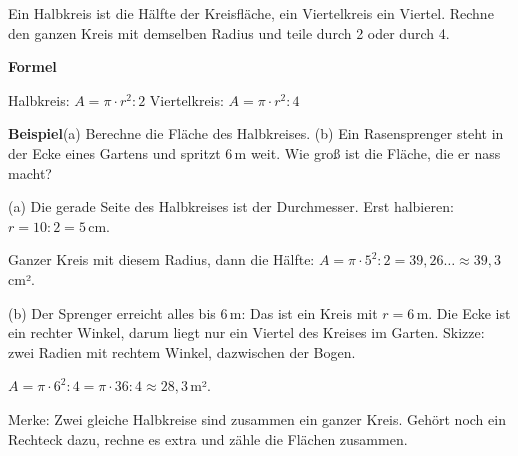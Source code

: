 \documentclass[11pt]{article}
\makeatletter
\newlength{\kr}
\newcommand{\karomerk}[2]{\protected@write\@auxout{}{\string\karoseite{#1}{#2}{\thepage}}}
\newcommand{\karoseite}[3]{\expandafter\xdef\csname karo@#1@#2\endcsname{#3}}
\makeatother
\begin{document}
\par\vspace{3mm}\setlength{\kr}{\dimexpr\pagegoal-\pagetotal-10mm\relax}%
\ifdim\kr>12mm\karomerk{k}{A}\noindent{\scriptsize\color{mbgrau}Platz zum Rechnen}\par\nointerlineskip\vspace{1mm}\noindent
\begin{tikzpicture}\clip (0,0) rectangle ({\linewidth-0.5mm},\kr);\draw[black!16,line width=0.3pt,step=5mm] (0,0) grid (\linewidth,\kr);\end{tikzpicture}\fi\par
\clearpage\label{s:B}\noindent\colorbox{black!12}{}\hspace{3mm}{\Large\bfseries Halbkreis und Viertelkreis}\par\smallskip
\noindent Ein Halbkreis ist die Hälfte der Kreisfläche, ein Viertelkreis ein Viertel. Rechne den ganzen Kreis mit demselben Radius und teile durch 2 oder durch 4.\par\medskip
\noindent\textbf{Formel}\par\nopagebreak\noindent\hspace*{4mm}\begin{minipage}{\dimexpr\linewidth-4mm\relax}Halbkreis: $A = \pi \cdot r^2 : 2$ \qquad Viertelkreis: $A = \pi \cdot r^2 : 4$\end{minipage}\par\medskip
\noindent\textbf{Beispiel}\quad (a) Berechne die Fläche des Halbkreises. (b) Ein Rasensprenger steht in der Ecke eines Gartens und spritzt 6\,m weit. Wie groß ist die Fläche, die er nass macht?\par\smallskip
\noindent\begin{minipage}[t]{0.6\linewidth}\vspace{0pt}\par\noindent{}(a) Die gerade Seite des Halbkreises ist der Durchmesser. Erst halbieren: $r = 10 : 2 = 5$\,cm.\par\smallskip\par\noindent{}Ganzer Kreis mit diesem Radius, dann die Hälfte: $A = \pi \cdot 5^2 : 2 = 39{,}26\ldots \approx 39{,}3$\,cm².\par\smallskip\par\noindent{}(b) Der Sprenger erreicht alles bis 6\,m: Das ist ein Kreis mit $r = 6$\,m. Die Ecke ist ein rechter Winkel, darum liegt nur ein Viertel des Kreises im Garten. Skizze: zwei Radien mit rechtem Winkel, dazwischen der Bogen.\par\smallskip\par\noindent{}$A = \pi \cdot 6^2 : 4 = \pi \cdot 36 : 4 \approx 28{,}3$\,m².\par\smallskip\par\noindent{}Merke: Zwei gleiche Halbkreise sind zusammen ein ganzer Kreis. Gehört noch ein Rechteck dazu, rechne es extra und zähle die Flächen zusammen.\par\smallskip\end{minipage}\hfill
\end{document}
